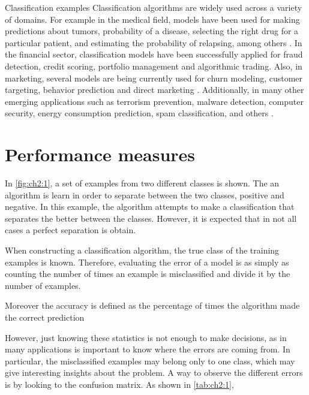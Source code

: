 	
\begin{remark}{Classification examples}
Classification algorithms are widely used across a variety of domains. For example in the 
medical field, models have been used for making predictions about tumors, probability 
of a disease, selecting the right drug for a particular patient, and estimating the probability of 
relapsing, among others \citep{Herland2014}. In the financial sector, classification models have 
been successfully applied for fraud detection, credit scoring, portfolio management and algorithmic 
trading. Also, in marketing, several models are being currently used for churn modeling, customer 
targeting, behavior prediction and direct marketing \citep{Baesens2014}. Additionally, in many 
other emerging applications such as terrorism prevention, malware detection, computer security, 
energy consumption prediction, spam classification, and others \citep{Kriegel2007}.
\end{remark}

\section{Performance measures}

In \figurename{ \ref{fig:ch2:1}}, a set of examples from two different classes is shown. The an 
algorithm is learn in order to separate between the two classes, positive and negative. In this 
example, the algorithm attempts to make a classification that separates the better between the 
classes. However, it is expected that in not all cases a perfect separation is obtain. 


When constructing a classification algorithm, the true class of the training examples is known. 
Therefore, evaluating the error of a model is as simply as counting the number of times an example 
is misclassified and divide it by the number of examples.


Moreover the accuracy is defined as the percentage of times the algorithm made the correct 
prediction


However, just knowing these statistics is not enough to make decisions, as in many applications is 
important to know where the errors are coming from. In particular, the misclassified examples may 
belong only to one class, which may give interesting insights about the problem.
A way to observe the different errors is by looking to the confusion matrix.
As shown in \tablename{ \ref{tab:ch2:1}}, 

